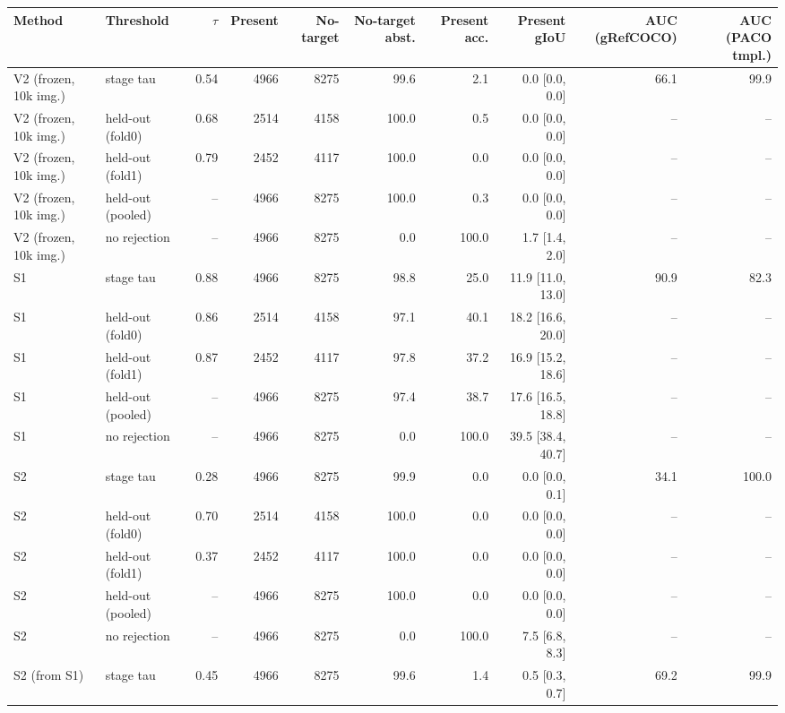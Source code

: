 \begin{tabular}{llrrrrrrrr}
\toprule
Method & Threshold & $\tau$ & Present & No-target & No-target abst. & Present acc. & Present gIoU & AUC (gRefCOCO) & AUC (PACO tmpl.) \\
\midrule
V2 (frozen, 10k img.) & stage tau & 0.54 & 4966 & 8275 & 99.6 & 2.1 & 0.0 \scriptsize{[0.0, 0.0]} & 66.1 & 99.9 \\
V2 (frozen, 10k img.) & held-out (fold0) & 0.68 & 2514 & 4158 & 100.0 & 0.5 & 0.0 \scriptsize{[0.0, 0.0]} & -- & -- \\
V2 (frozen, 10k img.) & held-out (fold1) & 0.79 & 2452 & 4117 & 100.0 & 0.0 & 0.0 \scriptsize{[0.0, 0.0]} & -- & -- \\
V2 (frozen, 10k img.) & held-out (pooled) & -- & 4966 & 8275 & 100.0 & 0.3 & 0.0 \scriptsize{[0.0, 0.0]} & -- & -- \\
V2 (frozen, 10k img.) & no rejection & -- & 4966 & 8275 & 0.0 & 100.0 & 1.7 \scriptsize{[1.4, 2.0]} & -- & -- \\
\midrule
S1 & stage tau & 0.88 & 4966 & 8275 & 98.8 & 25.0 & 11.9 \scriptsize{[11.0, 13.0]} & 90.9 & 82.3 \\
S1 & held-out (fold0) & 0.86 & 2514 & 4158 & 97.1 & 40.1 & 18.2 \scriptsize{[16.6, 20.0]} & -- & -- \\
S1 & held-out (fold1) & 0.87 & 2452 & 4117 & 97.8 & 37.2 & 16.9 \scriptsize{[15.2, 18.6]} & -- & -- \\
S1 & held-out (pooled) & -- & 4966 & 8275 & 97.4 & 38.7 & 17.6 \scriptsize{[16.5, 18.8]} & -- & -- \\
S1 & no rejection & -- & 4966 & 8275 & 0.0 & 100.0 & 39.5 \scriptsize{[38.4, 40.7]} & -- & -- \\
\midrule
S2 & stage tau & 0.28 & 4966 & 8275 & 99.9 & 0.0 & 0.0 \scriptsize{[0.0, 0.1]} & 34.1 & 100.0 \\
S2 & held-out (fold0) & 0.70 & 2514 & 4158 & 100.0 & 0.0 & 0.0 \scriptsize{[0.0, 0.0]} & -- & -- \\
S2 & held-out (fold1) & 0.37 & 2452 & 4117 & 100.0 & 0.0 & 0.0 \scriptsize{[0.0, 0.0]} & -- & -- \\
S2 & held-out (pooled) & -- & 4966 & 8275 & 100.0 & 0.0 & 0.0 \scriptsize{[0.0, 0.0]} & -- & -- \\
S2 & no rejection & -- & 4966 & 8275 & 0.0 & 100.0 & 7.5 \scriptsize{[6.8, 8.3]} & -- & -- \\
\midrule
S2 (from S1) & stage tau & 0.45 & 4966 & 8275 & 99.6 & 1.4 & 0.5 \scriptsize{[0.3, 0.7]} & 69.2 & 99.9 \\

\end{tabular}
